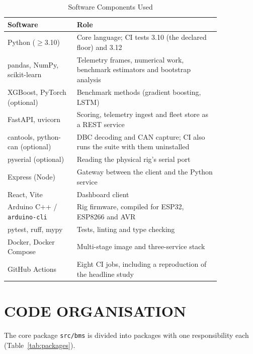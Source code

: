 \begin{table}[htbp]
	\caption{Software Components Used}
	\centering
	\small
	\renewcommand{\arraystretch}{1.15}
	\setlength{\tabcolsep}{4pt}
	\begin{tabular}{|L{0.27\linewidth}|L{0.57\linewidth}|}
		\hline
		\textbf{Software} & \textbf{Role} \\
		\hline
		Python ($\ge$3.10) & Core language; CI tests 3.10 (the declared floor) and 3.12 \\
		\hline
		pandas, NumPy, scikit-learn & Telemetry frames, numerical work, benchmark estimators and bootstrap analysis \\
		\hline
		XGBoost, PyTorch (optional) & Benchmark methods (gradient boosting, LSTM) \\
		\hline
		FastAPI, uvicorn & Scoring, telemetry ingest and fleet store as a REST service \\
		\hline
		cantools, python-can (optional) & DBC decoding and CAN capture; CI also runs the suite with them uninstalled \\
		\hline
		pyserial (optional) & Reading the physical rig's serial port \\
		\hline
		Express (Node) & Gateway between the client and the Python service \\
		\hline
		React, Vite & Dashboard client \\
		\hline
		Arduino C++ / \texttt{arduino-cli} & Rig firmware, compiled for ESP32, ESP8266 and AVR \\
		\hline
		pytest, ruff, mypy & Tests, linting and type checking \\
		\hline
		Docker, Docker Compose & Multi-stage image and three-service stack \\
		\hline
		GitHub Actions & Eight CI jobs, including a reproduction of the headline study \\
		\hline
	\end{tabular}
	\label{tab:software}
\end{table}

\section{CODE ORGANISATION}
\label{sec:impl-org}

The core package \texttt{src/bms} is divided into packages with one responsibility each (Table~\ref{tab:packages}).

